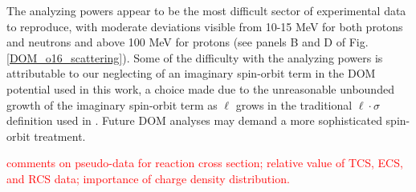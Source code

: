 \documentclass[twocolumn,secnumarabic,amssymb, nobibnotes, aps, prl,
superscriptaddress, nobalancelastpage]{revtex4}
\begin{document}
The analyzing powers appear to be the most difficult sector of experimental data to
reproduce, with moderate deviations visible from 10-15 MeV for both protons and
neutrons and above 100 MeV for
protons (see panels B and D of Fig. \ref{DOM_o16_scattering}). Some
of the difficulty with the analyzing powers is attributable to our neglecting of
an imaginary spin-orbit term in the DOM potential used in this work, a choice
made due to the unreasonable unbounded growth of the imaginary spin-orbit term
as $\ell$ grows in the traditional $\ell\cdot\sigma$ definition used in
\cite{KoningDelaroche}. Future DOM analyses may demand a more sophisticated spin-orbit treatment.

\textcolor{red}{comments on pseudo-data for reaction cross section; relative value of TCS, ECS, and RCS data; importance of charge density distribution.}
\end{document}
